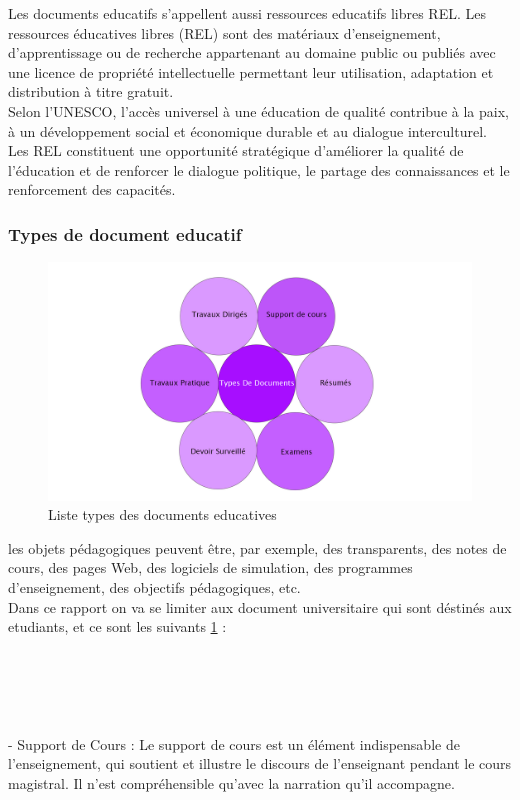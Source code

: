 \documentclass[12pt]{report}
\begin{document}
Les documents educatifs s'appellent aussi ressources educatifs libres REL.
Les ressources éducatives libres (REL) sont des matériaux d'enseignement, d'apprentissage ou de recherche appartenant au domaine public ou publiés avec une licence de propriété intellectuelle permettant leur utilisation, adaptation et distribution à titre gratuit.
\\Selon l’UNESCO, l'accès universel à une éducation de qualité contribue à la paix, à un développement social et économique durable et au dialogue interculturel. Les REL constituent une opportunité stratégique d'améliorer la qualité de l’éducation et de renforcer le dialogue politique, le partage des connaissances et le renforcement des capacités\cite{5}.

\subsubsection{Types de document educatif}
\begin{figure}[!hbtp]
    \centering
    \includegraphics[width=1\textwidth]{TypesDocs}
    \caption{Liste types des documents educatives}
    \label{fig:typedocumenteducatif}
\end{figure}

les objets pédagogiques peuvent être, par exemple, des transparents, des notes de cours, des pages Web, des logiciels de simulation, des programmes d'enseignement, des objectifs pédagogiques, etc\cite{6}.
\\

Dans ce rapport on va se limiter aux document universitaire qui sont
déstinés aux etudiants, et ce sont les suivants \ref{fig:typedocumenteducatif} :\\\\ \\ \\ \\ \\
- Support de Cours : Le support de cours est un élément indispensable de l'enseignement, qui soutient et illustre le discours de l'enseignant pendant le cours magistral. Il n'est compréhensible qu'avec la narration qu'il accompagne\cite{7}. \\
\end{document}
